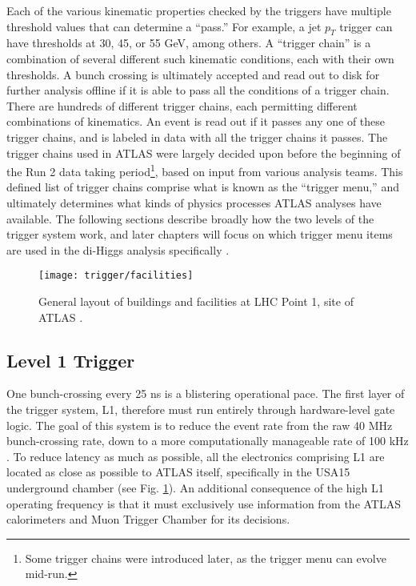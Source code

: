     Each of the various kinematic properties checked by the triggers have multiple threshold values that can determine a ``pass.''
    For example, a jet $p_T$ trigger can have thresholds at 30, 45, or 55 GeV, among others.
    A ``trigger chain'' is a combination of several different such kinematic conditions, each with their own thresholds.
    A bunch crossing is ultimately accepted and read out to disk for further analysis offline if it is able to pass all the conditions of a trigger chain.
    There are hundreds of different trigger chains, each permitting different combinations of kinematics.
    An event is read out if it passes any one of these trigger chains, and is labeled in data with all the trigger chains it passes.
    The trigger chains used in ATLAS were largely decided upon before the beginning of the Run 2 data taking period\footnote{
            Some trigger chains were introduced later, as the trigger menu can evolve mid-run.
        }, based on input from various analysis teams.
    This defined list of trigger chains comprise what is known as the ``trigger menu,'' and ultimately determines what kinds of physics processes ATLAS analyses have available.
    The following sections describe broadly how the two levels of the trigger system work, and later chapters will focus on which trigger menu items are used in the di-Higgs analysis specifically .

    \begin{figure}[h]
        \texttt{[image: trigger/facilities]}
        \caption{General layout of buildings and facilities at LHC Point 1, site of ATLAS \cite{trigger_tdr}.}
        \label{fig:facilities}
    \end{figure}


    \subsection{Level 1 Trigger}\label{sec:L1}

        One bunch-crossing every 25 ns is a blistering operational pace.
        The first layer of the trigger system, L1, therefore must run entirely through hardware-level gate logic.
        The goal of this system is to reduce the event rate from the raw 40 MHz bunch-crossing rate,
            down to a more computationally manageable rate of 100 kHz \cite{trigger_run2}.
        To reduce latency as much as possible, all the electronics comprising L1 are located as close as possible to ATLAS itself, specifically in the USA15 underground chamber \cite{trigger_tdr} (see Fig. \ref{fig:facilities}).
        An additional consequence of the high L1 operating frequency
            is that it must exclusively use information from the ATLAS calorimeters and Muon Trigger Chamber for its decisions.

